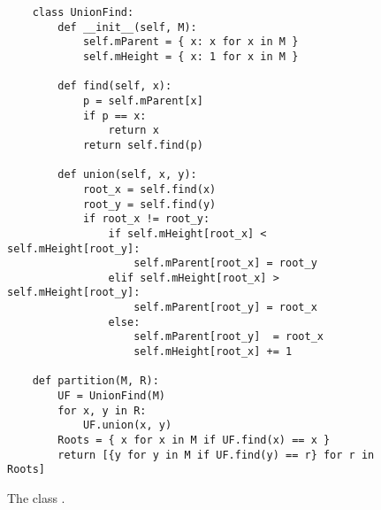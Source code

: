 \begin{figure}[!ht]
\centering
\begin{verbatim}
    class UnionFind:
        def __init__(self, M):
            self.mParent = { x: x for x in M }
            self.mHeight = { x: 1 for x in M }
            
        def find(self, x):
            p = self.mParent[x]
            if p == x:
                return x
            return self.find(p)

        def union(self, x, y):
            root_x = self.find(x)
            root_y = self.find(y)
            if root_x != root_y:
                if self.mHeight[root_x] < self.mHeight[root_y]:
                    self.mParent[root_x] = root_y
                elif self.mHeight[root_x] > self.mHeight[root_y]:
                    self.mParent[root_y] = root_x
                else:
                    self.mParent[root_y]  = root_x
                    self.mHeight[root_x] += 1
                    
    def partition(M, R):
        UF = UnionFind(M)
        for x, y in R:
            UF.union(x, y)
        Roots = { x for x in M if UF.find(x) == x }
        return [{y for y in M if UF.find(y) == r} for r in Roots]
\end{verbatim}
\vspace*{-0.3cm}
\caption{The class .}
\label{fig:Union-Find-OO.ipynb}
\end{figure}

